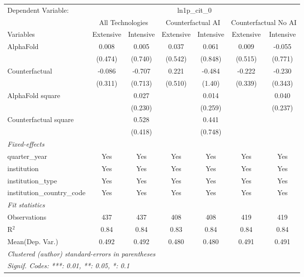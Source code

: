 \begingroup
\centering
\begin{tabular}{lcccccc}
   \tabularnewline \midrule \midrule
   Dependent Variable: & \multicolumn{6}{c}{ln1p\_cit\_0}\\
 & \multicolumn{2}{c}{All Technologies} & \multicolumn{2}{c}{Counterfactual AI} & \multicolumn{2}{c}{Counterfactual No AI} \\
\cmidrule(lr){1-1}\cmidrule(lr){2-3} \cmidrule(lr){4-5} \cmidrule(lr){6-7}
Variables & \multicolumn{1}{c}{Extensive} & \multicolumn{1}{c}{Intensive} & \multicolumn{1}{c}{Extensive} & \multicolumn{1}{c}{Intensive} & \multicolumn{1}{c}{Extensive} & \multicolumn{1}{c}{Intensive} \\
\cmidrule(lr){1-1}\cmidrule(lr){2-2} \cmidrule(lr){3-3} \cmidrule(lr){4-4} \cmidrule(lr){5-5} \cmidrule(lr){6-6} \cmidrule(lr){7-7}
   AlphaFold                    & 0.008   & 0.005   & 0.037   & 0.061   & 0.009   & -0.055\\   
                                & (0.474) & (0.740) & (0.542) & (0.848) & (0.515) & (0.771)\\   
   Counterfactual               & -0.086  & -0.707  & 0.221   & -0.484  & -0.222  & -0.230\\   
                                & (0.311) & (0.713) & (0.510) & (1.40)  & (0.339) & (0.343)\\   
   AlphaFold square             &         & 0.027   &         & 0.014   &         & 0.040\\   
                                &         & (0.230) &         & (0.259) &         & (0.237)\\   
   Counterfactual square        &         & 0.528   &         & 0.441   &         &   \\   
                                &         & (0.418) &         & (0.748) &         &   \\   
   \midrule
   \emph{Fixed-effects}\\
   quarter\_year                & Yes     & Yes     & Yes     & Yes     & Yes     & Yes\\  
   institution                  & Yes     & Yes     & Yes     & Yes     & Yes     & Yes\\  
   institution\_type            & Yes     & Yes     & Yes     & Yes     & Yes     & Yes\\  
   institution\_country\_code   & Yes     & Yes     & Yes     & Yes     & Yes     & Yes\\  
   \midrule
   \emph{Fit statistics}\\
   Observations                 & 437     & 437     & 408     & 408     & 419     & 419\\  
   R$^2$                        & 0.84    & 0.84    & 0.83    & 0.84    & 0.84    & 0.84\\  
Mean(Dep. Var.) & 0.492 & 0.492 & 0.480 & 0.480 & 0.491 & 0.491 \\
   \midrule \midrule
   \multicolumn{7}{l}{\emph{Clustered (author) standard-errors in parentheses}}\\
   \multicolumn{7}{l}{\emph{Signif. Codes: ***: 0.01, **: 0.05, *: 0.1}}\\
\end{tabular}
\par\endgroup
